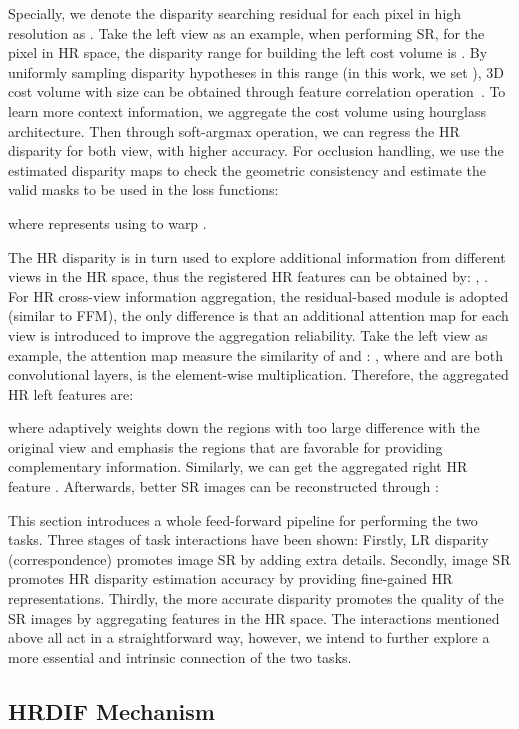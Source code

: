 \documentclass[sigconf]{acmart}
\begin{document}
Specially, we denote the disparity searching residual for each pixel in high resolution as . Take the left view as an example, when performing  SR, for the  pixel in HR space, the disparity range for building the left cost volume is . By uniformly sampling  disparity hypotheses in this range (in this work, we set ), 3D cost volume with size  can be obtained through feature correlation operation~\cite{Mayer2016ALD}. To learn more context information, we aggregate the cost volume using hourglass architecture. Then through soft-argmax operation, we can regress the HR disparity  for both view, with higher accuracy. For occlusion handling, we use the estimated disparity maps to check the geometric consistency and estimate the valid masks to be used in the loss functions:


where  represents using  to warp .

The HR disparity is in turn used to explore additional information from different views in the HR space, thus the registered HR features can be obtained by: , . For HR cross-view information aggregation, the residual-based module is adopted (similar to FFM), the only difference is that an additional attention map for each view is introduced to improve the aggregation reliability. Take the left view as example, the attention map measure the similarity of  and : , where  and  are both  convolutional layers,  is the element-wise multiplication. Therefore, the aggregated HR left features  are:


where  adaptively weights down the regions with too large difference with the original view and emphasis the regions that are favorable for providing complementary information. Similarly, we can get the aggregated right HR feature . Afterwards, better SR images can be reconstructed through :



This section introduces a whole feed-forward pipeline for performing the two tasks. Three stages of task interactions have been shown: Firstly, LR disparity (correspondence) promotes image SR by adding extra details. Secondly, image SR promotes HR disparity estimation accuracy by providing fine-gained HR representations. Thirdly, the more accurate disparity promotes the quality of the SR images by aggregating features in the HR space. The interactions mentioned above all act in a straightforward way, however, we intend to further explore a more essential and intrinsic connection of the two tasks. 

\subsection{HRDIF Mechanism}\label{feedback}
\end{document}
